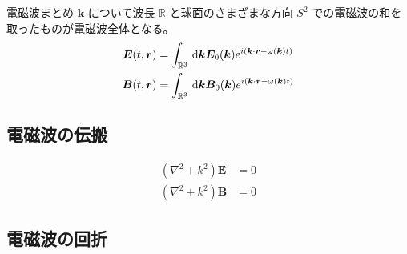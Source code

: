 \documentclass[uplatex,dvipdfmx,a4paper,11pt]{jlreq}
\newcommand{\RR}{\mathbb{R}}
\newcommand{\EE}{\bm{E}}
\newcommand{\BB}{\bm{B}}
\newcommand{\rr}{\bm{r}}
\newcommand{\kk}{\bm{k}}
\newcommand{\laplacian}{\nabla^2}
\numberwithin{equation}{section}
\theoremstyle{definition}
\begin{document}
\begin{itembox}[l]{電磁波まとめ}
  $\kk$ について波長 $\RR$ と球面のさまざまな方向 $S^2$ での電磁波の和を取ったものが電磁波全体となる。
  \begin{align}
    \EE(t, \rr) & = \int_{\RR^3}\dl{\kk}\EE_0(\kk)e^{i(\kk\cdot\rr - \omega(\kk)t)} \\
    \BB(t, \rr) & = \int_{\RR^3}\dl{\kk}\BB_0(\kk)e^{i(\kk\cdot\rr - \omega(\kk)t)}
  \end{align}
\end{itembox}


\subsection{電磁波の伝搬}
\begin{theorem}
  \begin{align}
    (\laplacian + k^2)\EE & = 0 \\
    (\laplacian + k^2)\BB & = 0
  \end{align}
\end{theorem}


\begin{theorem}[平行導体板]
\end{theorem}

\begin{theorem}[導波管内を伝搬する電磁波]
\end{theorem}

\begin{theorem}[円形断面の導波管内を伝搬する電磁波]
\end{theorem}

\begin{theorem}[直方形型の導波管内を伝搬する電磁波]
\end{theorem}


\subsection{電磁波の回折}

\begin{theorem}
\end{theorem}

\begin{theorem}
\end{theorem}

\begin{theorem}[Fraunhofer 回折]
\end{theorem}
\end{document}
